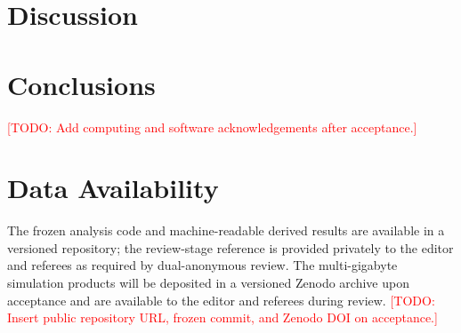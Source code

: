 \documentclass[twocolumn]{aastex631}
\newcommand{\todo}[1]{\textcolor{red}{[TODO: #1]}}
\begin{document}
\section{Discussion}
\label{sec:discussion}


\section{Conclusions}
\label{sec:conclusions}


\begin{acknowledgements}
\todo{Add computing and software acknowledgements after acceptance.}
\end{acknowledgements}

\section*{Data Availability}
The frozen analysis code and machine-readable derived results are available in a
versioned repository; the review-stage reference is provided privately to the
editor and referees as required by dual-anonymous review. The multi-gigabyte
simulation products will be deposited in a versioned Zenodo archive upon
acceptance and are available to the editor and referees during review.
\todo{Insert public repository URL, frozen commit, and Zenodo DOI on acceptance.}




\end{document}
